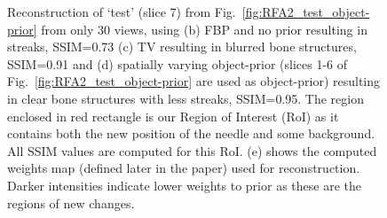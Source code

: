 \documentclass[journal]{IEEEtran}
\begin{document}
\begin{figure}[!h]
\centering
{}\hfill
{}\hfill
{}\hfill
{}
\caption{\small{ Reconstruction of `test' (slice 7) from Fig.~\ref{fig:RFA2_test_object-prior} from only 30 views, using (b) FBP and no prior resulting in streaks, SSIM=0.73 (c) TV resulting in blurred bone structures, SSIM=0.91 and (d) spatially varying object-prior (slices 1-6 of Fig.~\ref{fig:RFA2_test_object-prior} are used as object-prior) resulting in clear bone structures with less streaks, SSIM=0.95. The region enclosed in red rectangle is our Region of Interest (RoI) as it contains both the new position of the needle and some background. All SSIM values are computed for this RoI. (e) shows the computed weights map (defined later in the paper) used for reconstruction. Darker intensities indicate lower weights to prior as these are the regions of new changes.}}
\label{fig:RFA2_very_few_views}
\end{figure}


\end{document}
